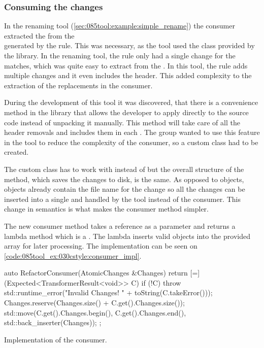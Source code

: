 \subsubsection*{Consuming the changes}

In the renaming tool (\cref{sec:085tool:example:simple_rename}) the  consumer extracted the  from the\\
 generated by the rule. This was necessary, as the tool used the  class provided by the library. In the renaming tool, the rule only had a single change for the matches, which was quite easy to extract from the . In this tool, the rule adds multiple changes and it even includes the  header. This added complexity to the extraction of the replacements in the consumer. 

During the development of this tool it was discovered, that there is a convenience method in the library that allows the developer to apply  directly to the source code instead of unpacking it manually. This method will take care of all the header removals and includes them in each . The group wanted to use this feature in the tool to reduce the complexity of the consumer, so a custom  class had to be created.

The custom class has to work with  instead of  but the overall structure of the  method, which saves the changes to disk, is the same. As opposed to  objects, objects already contain the file name for the change so all the changes can be inserted into a single   and handled by the tool instead of the consumer. This change in semantics is what makes the consumer method simpler. 

The new consumer method takes a  reference as a parameter and returns a lambda method which is a . The lambda inserts valid  objects into the provided  array for later processing. The implementation can be seen on \cref{code:085tool_ex:030cstyle:consumer_impl}.

\begin{listing}[H]
    \begin{cppcode}
auto RefactorConsumer(AtomicChanges &Changes) {
        return [=](Expected<TransformerResult<void>> C) {
            if (!C) {
                throw std::runtime_error("Invalid Changes! " + toString(C.takeError()));
            }
            Changes.reserve(Changes.size() + C.get().Changes.size());
            std::move(C.get().Changes.begin(), C.get().Changes.end(), std::back_inserter(Changes));
        };
}
    \end{cppcode}
    \caption{Implementation of the  consumer.}
    \label{code:085tool_ex:030cstyle:consumer_impl}
\end{listing}

